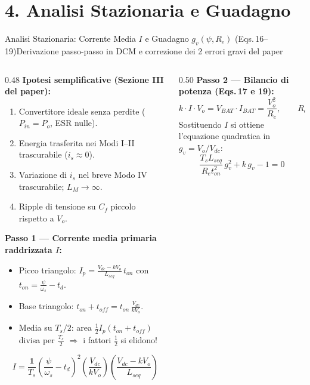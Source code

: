 \documentclass[aspectratio=169,9pt]{beamer}
\begin{document}
\section{4. Analisi Stazionaria e Guadagno}

\begin{frame}{Analisi Stazionaria: Corrente Media $I$ e Guadagno $g_v(\psi, R_e)$ (Eqs.\,16--19)}{Derivazione passo-passo in DCM e correzione dei 2 errori gravi del paper}
  \begin{columns}[T,onlytextwidth]
    \begin{column}{0.48\textwidth}
      \scriptsize
      \textbf{\color{PrimaryBlue}Ipotesi semplificative (Sezione III del paper):}
      \begin{enumerate}\setlength{\itemsep}{1pt}
        \item Convertitore ideale senza perdite ($P_{in} = P_o$, ESR nulle).
        \item Energia trasferita nei Modi I--II trascurabile ($i_s \approx 0$).
        \item Variazione di $i_s$ nel breve Modo IV trascurabile; $L_M \to \infty$.
        \item Ripple di tensione su $C_f$ piccolo rispetto a $V_o$.
      \end{enumerate}

      \vspace*{2mm}
      \textbf{\color{PrimaryBlue}Passo 1 --- Corrente media primaria raddrizzata $I$:}
      \begin{itemize}\setlength{\itemsep}{1.2pt}
        \item Picco triangolo: $I_p = \frac{V_{dc}-kV_o}{L_{seq}}\,t_{on}$ con $t_{on}=\frac{\psi}{\omega_s}-t_d$.
        \item Base triangolo: $t_{on}+t_{off} = t_{on}\,\frac{V_{dc}}{kV_o}$.
        \item Media su $T_s/2$: area $\frac{1}{2}I_p(t_{on}+t_{off})$ divisa per $\frac{T_s}{2}$ $\Rightarrow$ i fattori $\frac{1}{2}$ si elidono!
      \end{itemize}
      \begin{formulabox}[title={Eq.\,(16) Corretta (nel paper fattore $2/T_s$ errato!)}]
        \[
          I = \frac{\mathbf{1}}{T_s}\left(\frac{\psi}{\omega_s}-t_d\right)^2\!\left(\frac{V_{dc}}{kV_o}\right)\!\left(\frac{V_{dc}-kV_o}{L_{seq}}\right)
        \]
      \end{formulabox}
    \end{column}
    \begin{column}{0.50\textwidth}
      \scriptsize
      \textbf{\color{PrimaryBlue}Passo 2 --- Bilancio di potenza (Eqs.\,17 e 19):}
      \[
        k \cdot I \cdot V_o = V_{BAT}\cdot I_{BAT} = \frac{V_o^2}{R_e}, \qquad R_e = \frac{V_{BAT}}{I_{BAT}}
      \]
      Sostituendo $I$ si ottiene l'equazione quadratica in $g_v = V_o/V_{dc}$:
      \[
        \frac{T_s L_{seq}}{R_e t_{on}^2}\,g_v^2 + k\,g_v - 1 = 0
      \]


\end{column}
\end{columns}
\end{frame}
\end{document}
